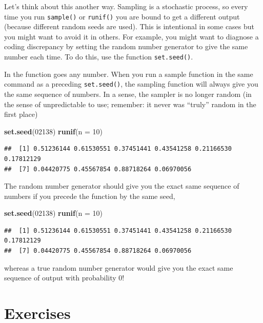 \documentclass[]{book}
\newenvironment{Shaded}{\begin{snugshade}}{\end{snugshade}}
\newcommand{\KeywordTok}[1]{\textcolor[rgb]{0.13,0.29,0.53}{\textbf{#1}}}
\newcommand{\DataTypeTok}[1]{\textcolor[rgb]{0.13,0.29,0.53}{#1}}
\newcommand{\DecValTok}[1]{\textcolor[rgb]{0.00,0.00,0.81}{#1}}
\newcommand{\NormalTok}[1]{#1}
\theoremstyle{definition}
\theoremstyle{definition}
\theoremstyle{definition}
\theoremstyle{remark}
\begin{document}
Let's think about this another way. Sampling is a stochastic process, so
every time you run \texttt{sample()} or \texttt{runif()} you are bound
to get a different output (because different random seeds are used).
This is intentional in some cases but you might want to avoid it in
others. For example, you might want to diagnose a coding discrepancy by
setting the random number generator to give the same number each time.
To do this, use the function \texttt{set.seed()}.

In the function goes any number. When you run a sample function in the
same command as a preceding \texttt{set.seed()}, the sampling function
will always give you the same sequence of numbers. In a sense, the
sampler is no longer random (in the sense of unpredictable to use;
remember: it never was ``truly'' random in the first place)

\begin{Shaded}
\begin{Highlighting}[]
\KeywordTok{set.seed}\NormalTok{(}\DecValTok{02138}\NormalTok{)}
\KeywordTok{runif}\NormalTok{(}\DataTypeTok{n =} \DecValTok{10}\NormalTok{)}
\end{Highlighting}
\end{Shaded}

\begin{verbatim}
##  [1] 0.51236144 0.61530551 0.37451441 0.43541258 0.21166530 0.17812129
##  [7] 0.04420775 0.45567854 0.88718264 0.06970056
\end{verbatim}

The random number generator should give you the exact same sequence of
numbers if you precede the function by the same seed,

\begin{Shaded}
\begin{Highlighting}[]
\KeywordTok{set.seed}\NormalTok{(}\DecValTok{02138}\NormalTok{)}
\KeywordTok{runif}\NormalTok{(}\DataTypeTok{n =} \DecValTok{10}\NormalTok{)}
\end{Highlighting}
\end{Shaded}

\begin{verbatim}
##  [1] 0.51236144 0.61530551 0.37451441 0.43541258 0.21166530 0.17812129
##  [7] 0.04420775 0.45567854 0.88718264 0.06970056
\end{verbatim}

whereas a true random number generator would give you the exact same
sequence of output with probability 0!

\section*{Exercises}\label{exercises-4}
\end{document}

